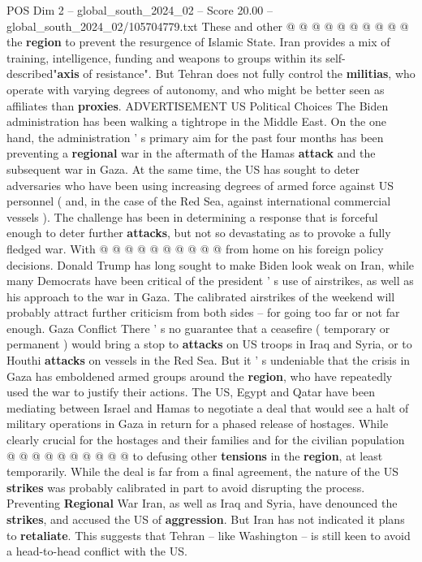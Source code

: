 \begin{textsample}{POS Dim 2 – global\_south\_2024\_02 – Score 20.00 – global\_south\_2024\_02/105704779.txt}
These and other @ @ @ @ @ @ @ @ @ @ the \textbf{region} to prevent the resurgence of Islamic State.
Iran provides a mix of training, intelligence, funding and weapons to groups within its self-described"\textbf{axis} of resistance".
But Tehran does not fully control the \textbf{militias}, who operate with varying degrees of autonomy, and who might be better seen as affiliates than \textbf{proxies}.
ADVERTISEMENT US Political Choices The Biden administration has been walking a tightrope in the Middle East.
On the one hand, the administration ' s primary aim for the past four months has been preventing a \textbf{regional} war in the aftermath of the Hamas \textbf{attack} and the subsequent war in Gaza.
At the same time, the US has sought to deter adversaries who have been using increasing degrees of armed force against US personnel ( and, in the case of the Red Sea, against international commercial vessels ).
The challenge has been in determining a response that is forceful enough to deter further \textbf{attacks}, but not so devastating as to provoke a fully fledged war.
With @ @ @ @ @ @ @ @ @ @ from home on his foreign policy decisions.
Donald Trump has long sought to make Biden look weak on Iran, while many Democrats have been critical of the president ' s use of airstrikes, as well as his approach to the war in Gaza.
The calibrated airstrikes of the weekend will probably attract further criticism from both sides -- for going too far or not far enough.
Gaza Conflict There ' s no guarantee that a ceasefire ( temporary or permanent ) would bring a stop to \textbf{attacks} on US troops in Iraq and Syria, or to Houthi \textbf{attacks} on vessels in the Red Sea.
But it ' s undeniable that the crisis in Gaza has emboldened armed groups around the \textbf{region}, who have repeatedly used the war to justify their actions.
The US, Egypt and Qatar have been mediating between Israel and Hamas to negotiate a deal that would see a halt of military operations in Gaza in return for a phased release of hostages.
While clearly crucial for the hostages and their families and for the civilian population @ @ @ @ @ @ @ @ @ @ to defusing other \textbf{tensions} in the \textbf{region}, at least temporarily.
While the deal is far from a final agreement, the nature of the US \textbf{strikes} was probably calibrated in part to avoid disrupting the process.
Preventing \textbf{Regional} War Iran, as well as Iraq and Syria, have denounced the \textbf{strikes}, and accused the US of \textbf{aggression}.
But Iran has not indicated it plans to \textbf{retaliate}.
This suggests that Tehran -- like Washington -- is still keen to avoid a head-to-head conflict with the US.

\end{textsample}
